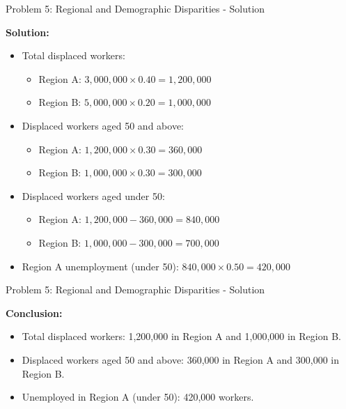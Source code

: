 \documentclass{beamer}
\begin{document}
\begin{frame}{Problem 5: Regional and Demographic Disparities - Solution}

\textbf{Solution:}
\begin{itemize}
    \item Total displaced workers:
    \begin{itemize}
        \item Region A: \( 3,000,000 \times 0.40 = 1,200,000 \)
        \item Region B: \( 5,000,000 \times 0.20 = 1,000,000 \)
    \end{itemize}
    \item Displaced workers aged 50 and above:
    \begin{itemize}
        \item Region A: \( 1,200,000 \times 0.30 = 360,000 \)
        \item Region B: \( 1,000,000 \times 0.30 = 300,000 \)
    \end{itemize}
    \item Displaced workers aged under 50:
    \begin{itemize}
        \item Region A: \( 1,200,000 - 360,000 = 840,000 \)
        \item Region B: \( 1,000,000 - 300,000 = 700,000 \)
    \end{itemize}
    \item Region A unemployment (under 50): \( 840,000 \times 0.50 = 420,000 \)
\end{itemize}


\end{frame}



\begin{frame}{Problem 5: Regional and Demographic Disparities - Solution}

\textbf{Conclusion:}
\begin{itemize}
    \item Total displaced workers: 1,200,000 in Region A and 1,000,000 in Region B.
    \item Displaced workers aged 50 and above: 360,000 in Region A and 300,000 in Region B.
    \item Unemployed in Region A (under 50): 420,000 workers.
\end{itemize}
\end{frame}
\end{document}
